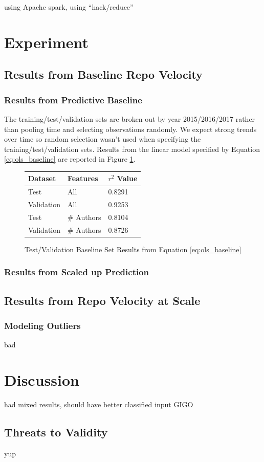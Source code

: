 \documentclass{article}
\begin{document}
using Apache spark, using ``hack/reduce''

\section{Experiment}

\subsection{Results from Baseline Repo Velocity}

\subsubsection{Results from Predictive Baseline}

The training/test/validation sets are broken out by year 2015/2016/2017
rather than pooling time and selecting observations randomly. We expect
strong trends over time so random selection wasn't used when specifying the
training/test/validation sets. Results from the linear model specified
by Equation \ref{eq:ols_baseline} are reported in Figure
\ref{fig:ols_baseline}. 

\begin{figure}[h]
  \centering
  \begin{tabular}{ l|l|l }
    Dataset & Features & $r^2$ Value \\
    \hline
    Test       & All        & 0.8291 \\
    Validation & All        & 0.9253 \\
    Test       & \# Authors & 0.8104 \\
    Validation & \# Authors & 0.8726 \\
  \end{tabular}
  \caption{Test/Validation Baseline Set Results from Equation
    \ref{eq:ols_baseline}}
  \label{fig:ols_baseline}
\end{figure}


\subsubsection{Results from Scaled up Prediction}

\subsection{Results from Repo Velocity at Scale}


\subsubsection{Modeling Outliers}

bad 

\section{Discussion}

had mixed results, should have better classified input GIGO

\subsection{Threats to Validity}

 yup



\end{document}
